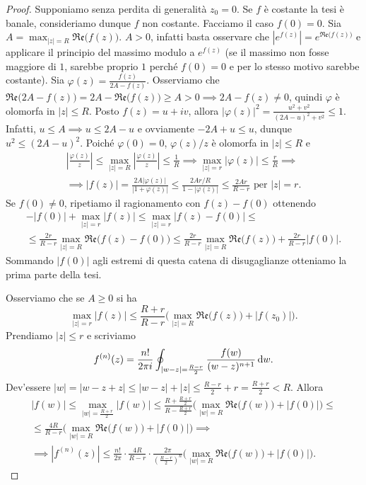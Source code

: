 \begin{proof}
  Supponiamo senza perdita di generalità $z_0=0$. Se $f$ è costante la tesi è banale, consideriamo dunque $f$ non costante. Facciamo il caso $f(0)=0$. Sia $\displaystyle A=\max_{|z|=R}\mathfrak{Re}\big(f(z)\big)$. $A>0$, infatti basta osservare che $|e^{f(z)}|=e^{\mathfrak{Re}\big(f(z)\big)}$ e applicare il principio del massimo modulo a $e^{f(z)}$ (se il massimo non fosse maggiore di $1$, sarebbe proprio $1$ perché $f(0)=0$ e per lo stesso motivo sarebbe costante). Sia $\varphi(z)=\frac{f(z)}{2A-f(z)}$.
  Osserviamo che $\mathfrak{Re}\big(2A-f(z)\big)=2A-\mathfrak{Re}\big(f(z)\big) \ge A>0 \implies 2A-f(z)\not=0$, quindi $\varphi$ è olomorfa in $|z| \le R$.
  Posto $f(z)=u+iv$, allora $|\varphi(z)|^2=\frac{u^2+v^2}{(2A-u)^2+v^2} \le 1$. Infatti, $u \le A \implies u \le 2A-u$ e ovviamente $-2A+u \le u$, dunque $u^2 \le (2A-u)^2$.
  Poiché $\varphi(0)=0$, $\varphi(z)/z$ è olomorfa in $|z| \le R$ e
  \begin{gather*}
    \left|\frac{\varphi(z)}{z}\right| \le \max_{|z|=R} \left|\frac{\varphi(z)}{z}\right| \le \frac{1}{R} \implies \max_{|z|=r} |\varphi(z)| \le \frac{r}{R} \implies \\
    \implies |f(z)|=\frac{2A|\varphi(z)|}{|1+\varphi(z)|} \le \frac{2Ar/R}{1-|\varphi(z)|} \le \frac{2Ar}{R-r} \text{ per } |z|=r.
  \end{gather*}
  Se $f(0)\not=0$, ripetiamo il ragionamento con $f(z)-f(0)$ ottenendo
  \begin{gather*}
    -|f(0)|+\max_{|z|=r}|f(z)| \le \max_{|z|=r} |f(z)-f(0)| \le \\
    \le \frac{2r}{R-r}\max_{|z|=R}\mathfrak{Re}\big(f(z)-f(0)\big) \le \frac{2r}{R-r}\max_{|z|=R}\mathfrak{Re}\big(f(z)\big)+\frac{2r}{R-r}|f(0)|.
  \end{gather*}
  Sommando $|f(0)|$ agli estremi di questa catena di disugaglianze otteniamo la prima parte della tesi.

  Osserviamo che se $A \ge 0$ si ha
  $$\max_{|z|=r} |f(z)| \le \frac{R+r}{R-r}\Big(\max_{|z|=R}\mathfrak{Re}\big(f(z)\big)+|f(z_0)|\Big).$$
  Prendiamo $|z| \le r$ e scriviamo
  $$f^{(n)}(z)=\frac{n!}{2\pi i} \oint_{|w-z|=\frac{R-r}{2}} \frac{f(w)}{(w-z)^{n+1}}\mathop{}\!\mathrm{d} w.$$
  Dev'essere $|w|=|w-z+z| \le |w-z|+|z| \le \frac{R-r}{2}+r=\frac{R+r}{2}<R$. Allora
  \begin{gather*}
    |f(w)| \le \max_{|w|=\frac{R+r}{2}} |f(w)| \le \frac{R+\frac{R+r}{2}}{R-\frac{R+r}{2}}\Big(\max_{|w|=R}\mathfrak{Re}\big(f(w)\big)+|f(0)|\Big) \le \\
    \le \frac{4R}{R-r}\Big(\max_{|w|=R}\mathfrak{Re}\big(f(w)\big)+|f(0)|\Big) \implies \\
    \implies |f^{(n)}(z)| \le \frac{n!}{2\pi}\cdot\frac{4R}{R-r}\cdot\frac{2\pi}{\left(\frac{R-r}{2}\right)^n}\Big(\max_{|w|=R}\mathfrak{Re}\big(f(w)\big)+|f(0)|\Big).
  \end{gather*}
\end{proof}

